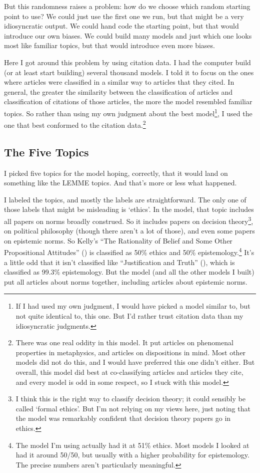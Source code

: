 \documentclass[
  10pt,
  letterpaper,
  DIV=11,
  numbers=noendperiod,
  twoside]{scrartcl}
\begin{document}
But this randomness raises a problem: how do we choose which random
starting point to use? We could just use the first one we run, but that
might be a very idiosyncratic output. We could hand code the starting
point, but that would introduce our own biases. We could build many
models and just which one looks most like familiar topics, but that
would introduce even more biases.

Here I got around this problem by using citation data. I had the
computer build (or at least start building) several thousand models. I
told it to focus on the ones where articles were classified in a similar
way to articles that they cited. In general, the greater the similarity
between the classification of articles and classification of citations
of those articles, the more the model resembled familiar topics. So
rather than using my own judgment about the best model\footnote{If I had
  used my own judgment, I would have picked a model similar to, but not
  quite identical to, this one. But I'd rather trust citation data than
  my idiosyncratic judgments.}, I used the one that best conformed to
the citation data.\footnote{There was one real oddity in this model. It
  put articles on phenomenal properties in metaphysics, and articles on
  dispositions in mind. Most other models did not do this, and I would
  have preferred this one didn't either. But overall, this model did
  best at co-classifying articles and articles they cite, and every
  model is odd in some respect, so I stuck with this model.}

\subsection{The Five Topics}\label{sec-five-topics}

I picked five topics for the model hoping, correctly, that it would land
on something like the LEMME topics. And that's more or less what
happened.

I labeled the topics, and mostly the labels are straightforward. The
only one of those labels that might be misleading is `ethics'. In the
model, that topic includes all papers on norms broadly construed. So it
includes papers on decision theory\footnote{I think this is the right
  way to classify decision theory; it could sensibly be called `formal
  ethics'. But I'm not relying on my views here, just noting that the
  model was remarkably confident that decision theory papers go in
  ethics.}, on political philosophy (though there aren't a lot of
those), and even some papers on epistemic norms. So Kelly's ``The
Rationality of Belief and Some Other Propositional Attitudes''
() is classified as 50\%
ethics and 50\% epistemology.\footnote{The model I'm using actually had
  it at 51\% ethics. Most models I looked at had it around 50/50, but
  usually with a higher probability for epistemology. The precise
  numbers aren't particularly meaningful.} It's a little odd that it
isn't classified like ``Justification and Truth''
(), which is classified
as 99.3\% epistemology. But the model (and all the other models I built)
put all articles about norms together, including articles about
epistemic norms.
\end{document}
